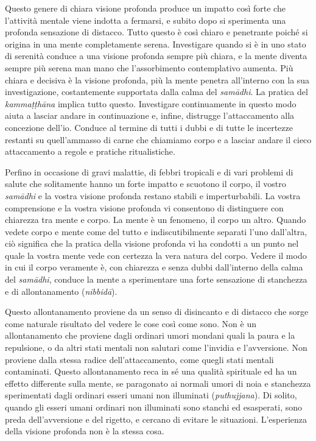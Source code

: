 Questo genere di chiara visione profonda produce un impatto così forte
che l'attività mentale viene indotta a fermarsi, e subito dopo si
sperimenta una profonda sensazione di distacco. Tutto questo è così
chiaro e penetrante poiché si origina in una mente completamente serena.
Investigare quando si è in uno stato di serenità conduce a una visione
profonda sempre più chiara, e la mente diventa sempre più serena man
mano che l'assorbimento contemplativo aumenta. Più chiara e decisiva è
la visione profonda, più la mente penetra all'interno con la sua
investigazione, costantemente supportata dalla calma del \emph{samādhi}.
La pratica del \emph{kammaṭṭhāna} implica tutto questo. Investigare
continuamente in questo modo aiuta a lasciar andare in continuazione e,
infine, distrugge l'attaccamento alla concezione dell'io. Conduce al
termine di tutti i dubbi e di tutte le incertezze restanti su
quell'ammasso di carne che chiamiamo corpo e a lasciar andare il cieco
attaccamento a regole e pratiche ritualistiche.

Perfino in occasione di gravi malattie, di febbri tropicali e di vari
problemi di salute che solitamente hanno un forte impatto e scuotono il
corpo, il vostro \emph{samādhi} e la vostra visione profonda restano
stabili e imperturbabili. La vostra comprensione e la vostra visione
profonda vi consentono di distinguere con chiarezza tra mente e corpo.
La mente è un fenomeno, il corpo un altro. Quando vedete corpo e mente
come del tutto e indiscutibilmente separati l'uno dall'altra, ciò
significa che la pratica della visione profonda vi ha condotti a un
punto nel quale la vostra mente vede con certezza la vera natura del
corpo. Vedere il modo in cui il corpo veramente è, con chiarezza e senza
dubbi dall'interno della calma del \emph{samādhi}, conduce la mente a
sperimentare una forte sensazione di stanchezza e di allontanamento
(\emph{nibbidā}).

Questo allontanamento proviene da un senso di disincanto e di distacco
che sorge come naturale risultato del vedere le cose così come sono. Non
è un allontanamento che proviene dagli ordinari umori mondani quali la
paura e la repulsione, o da altri stati mentali non salutari come
l'invidia e l'avversione. Non proviene dalla stessa radice
dell'attaccamento, come quegli stati mentali contaminati. Questo
allontanamento reca in sé una qualità spirituale ed ha un effetto
differente sulla mente, se paragonato ai normali umori di noia e
stanchezza sperimentati dagli ordinari esseri umani non illuminati
(\emph{puthujjana}). Di solito, quando gli esseri umani ordinari non
illuminati sono stanchi ed esasperati, sono preda dell'avversione e del
rigetto, e cercano di evitare le situazioni. L'esperienza della visione
profonda non è la stessa cosa.

